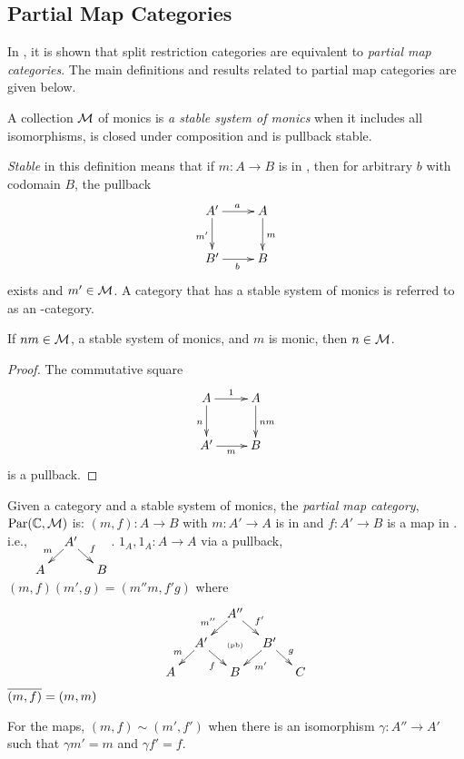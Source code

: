 \subsection{Partial Map Categories} %
\label{sub:partial_map_categories}

In \cite{cockett2002:restcategories1}, it is shown that split restriction categories are 
equivalent to \emph{partial map categories}. The main definitions and results related to 
partial map categories are given below.

\begin{definition}
  A collection $\mathcal{M}$ of monics is \emph{a stable system of monics}
  when it includes all isomorphisms, is closed under composition and is
  pullback stable.
\end{definition}

\emph{Stable} in this definition means that if $m:A\to B$ is in \Mstab, then for arbitrary 
$b$ with codomain $B$, the pullback
\[
  \xymatrix{
    A'\ar[r]^a \ar[d]_{m'} &A\ar[d]^{m}\\
    B' \ar[r]_{b} & B
  }
\]
exists and $m' \in \mathcal{M}$. A category that has a stable system of monics
is referred to as an \Mstab-category.

\begin{lemma}
  If $nm \in \mathcal{M}$, a stable system of monics, and $m$ is monic, then $n \in \mathcal{M}$.
\end{lemma}
\begin{proof}
  The commutative square
  \[
    \xymatrix{
      A\ar[d]_n \ar[r]^{1} &A\ar[d]^{nm}\\
      A' \ar[r]_{m} & B
    }
  \] 
  is a pullback.
\end{proof}

Given a category \C and a stable system of monics, the \emph{partial map category}, 
$\text{Par}(\mathbb{C},\mathcal{M})$ is:
    {$(m,f):A\to B$  with $m:A' \to A$ is in \Mstab and $f:A' \to B$ is a map in \C. i.e.,
      $\xymatrix @R-15pt @C-15pt{&A'\ar[dl]_{m} \ar[dr]^{f}\\A&&B}$.}
    {$1_A,1_A:A \to A$}
    {via a pullback, $(m,f)(m',g) = (m'' m, f' g)$ where
      \[
        \xymatrix @C-15pt @R-15pt{
          &&A''\ar[dl]_{m''}\ar[dr]^{f'}\\
          &A'\ar[dl]_{m}\ar[dr]_{f}&\text{{\tiny (pb)}}&B'\ar[dl]^{m'}\ar[dr]^{g}\\
          A&&B&&C
        }
      \]
    }
    {$\overline{(m,f)} = (m,m)$}

For the maps, $(m,f) \sim (m',f')$ when there is an isomorphism $\gamma : A'' \to A'$ 
such that $\gamma m' = m$ and $\gamma f' = f$.

